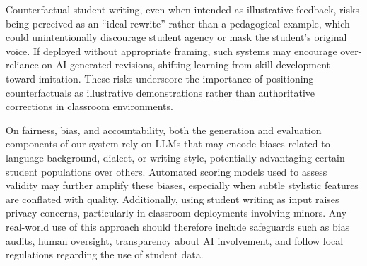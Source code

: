 \documentclass[letterpaper]{article} %
\begin{document}
Counterfactual student writing, even when intended as illustrative feedback, risks being perceived as an “ideal rewrite” rather than a pedagogical example, which could unintentionally discourage student agency or mask the student’s original voice. If deployed without appropriate framing, such systems may encourage over-reliance on AI-generated revisions, shifting learning from skill development toward imitation. These risks underscore the importance of positioning counterfactuals as illustrative demonstrations rather than authoritative corrections in classroom environments.

On fairness, bias, and accountability, both the generation and evaluation components of our system rely on LLMs that may encode biases related to language background, dialect, or writing style, potentially advantaging certain student populations over others. Automated scoring models used to assess validity may further amplify these biases, especially when subtle stylistic features are conflated with quality. Additionally, using student writing as input raises privacy concerns, particularly in classroom deployments involving minors. Any real-world use of this approach should therefore include safeguards such as bias audits, human oversight, transparency about AI involvement, and follow local regulations regarding the use of student data.


\end{document}
